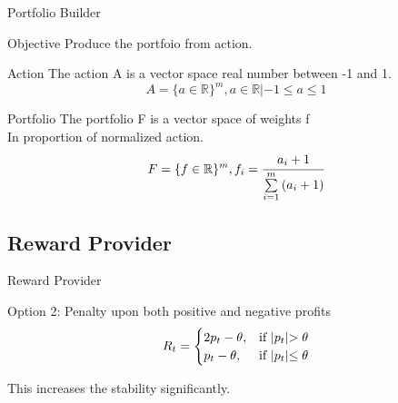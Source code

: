 \begin{frame}{Portfolio Builder}
\begin{block}{Objective}
Produce the portfoio from action.
\end{block}
\begin{block}{Action}
The action A is a vector space real number between -1 and 1.
\[
    A = \{ {a \in \mathbb{R} } \} ^m,
    a \in \mathbb{R} | -1 \leq a \leq 1 
\]
\end{block}
\begin{block}{Portfolio}
The portfolio F is a vector space of weights f\\
In proportion of normalized action.
\[
    F = \{ {f \in \mathbb{R} } \} ^m,
    {f_i} = \cfrac {a_i+1}{\sum\limits_{i=1}^m {(a_i+1)}}
\]
\end{block}

\end{frame}

\subsection{Reward Provider}

\begin{frame}{Reward Provider}
\begin{block}{Option 2: Penalty upon both positive and negative profits}
\[
R_t = 
\begin{cases}
    2p_t - \theta,&\text{if  }    $$|p_t|$$ > \theta\\
    p_t - \theta ,&\text{if  } $$|p_t|$$\leq  \theta
\end{cases}
\]
\end{block}
\alert{This increases the stability significantly.}
\end{frame}



